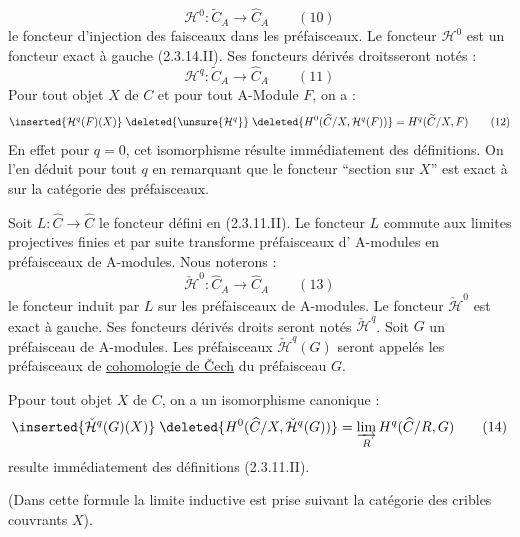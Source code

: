 \[
\mathcal H^0:\widetilde C_A\longrightarrow\widehat C_A \qquad(10)
\]
le foncteur d'injection des faisceaux dans les préfaisceaux.
Le foncteur $\mathcal H^0$ est un foncteur exact à gauche (2.3.14.II).
Ses foncteurs dérivés droitsseront notés :
\[
\mathcal H^q:\widetilde C_A\longrightarrow\widehat C_A \qquad(11)
\]
Pour tout objet $X$ de $C$  et pour tout A-Module $F$, on a :
\[
\inserted{\mathcal H^q(F)(X)}\;\deleted{\unsure{\mathcal H^q}}\;
\deleted{H^0(\widehat C/X,\mathcal H^q(F))}=H^q(\widetilde C/X,F)\qquad(12)
\]
En effet pour $q=0$, cet isomorphisme résulte immédiatement des définitions. On l'en déduit pour tout $q$ en remarquant que le foncteur ``section sur $X$'' est exact à sur la catégorie des préfaisceaux.

Soit $L:\widehat C\longrightarrow\widehat C$ le foncteur défini en (2.3.11.II).
Le foncteur $L$ commute aux limites projectives finies et par suite transforme \margin{$\unsure{\rho}\quad\unsure{\rho}$} préfaisceaux d' A-modules en préfaisceaux de A-modules. Nous noterons :
\[
\check{\mathcal H}^{0}:\widehat C_A\longrightarrow\widehat C_A \qquad(13)
\]
le foncteur induit par $L$ sur les préfaisceaux de A-modules.
Le foncteur $\check{\mathcal H}^0$ est exact à  gauche. Ses foncteurs dérivés droits seront notés $\check{\mathcal H}^q$.  Soit $G$ un préfaisceau de A-modules. Les préfaisceaux $\check{\mathcal H}^q(G)$ seront appelés les préfaisceaux de \uline{cohomologie de \v{C}ech} du préfaisceau $G$.

Ppour tout objet $X$ de $C$, on a un isomorphisme canonique :
\[
\inserted{\check{\mathcal H}^q(G)(X)}\;\deleted{H^0(\widehat C/X,\check{\mathcal H}^q(G))}
=\varinjlim_R H^q(\widehat C/R,G)\qquad(14)
\]
  resulte immédiatement des définitions (2.3.11.II).

(Dans cette formule la limite inductive est prise suivant la catégorie des cribles couvrants $X$).
